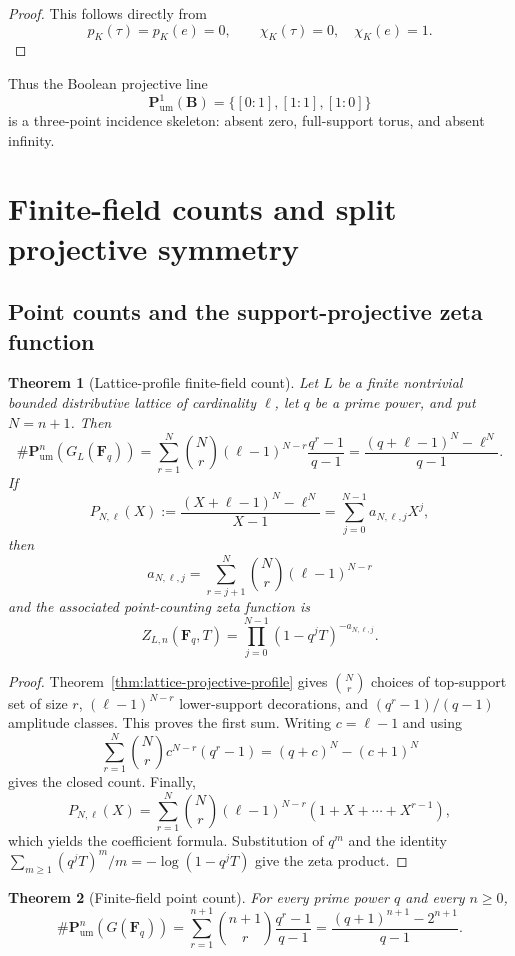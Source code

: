 \documentclass[11pt]{amsart}
\numberwithin{equation}{section}
\newtheorem{theorem}{Theorem}[section]
\theoremstyle{definition}
\newcommand{\B}{\mathbf B}
\newcommand{\F}{\mathbf F}
\newcommand{\Pum}{\mathbf P_{\mathrm{um}}}
\begin{document}
\begin{proof}
This follows directly from
\[
p_K(\tau)=p_K(e)=0,
\qquad
\chi_K(\tau)=0,
\quad
\chi_K(e)=1.
\]
\end{proof}

Thus the Boolean projective line
\[
\Pum^1(\B)=\{[0:1],[1:1],[1:0]\}
\]
is a three-point incidence skeleton: absent zero, full-support torus, and absent infinity.

\section{Finite-field counts and split projective symmetry}

\subsection{Point counts and the support-projective zeta function}


\begin{theorem}[Lattice-profile finite-field count]
\label{thm:lattice-finite-field-count}
Let $L$ be a finite nontrivial bounded distributive lattice of cardinality
$\ell$, let $q$ be a prime power, and put $N=n+1$.  Then
\[
\boxed{
\#\Pum^n(G_L(\F_q))
=\sum_{r=1}^{N}\binom Nr(\ell-1)^{N-r}\frac{q^r-1}{q-1}
=\frac{(q+\ell-1)^N-\ell^N}{q-1}.
}
\]
If
\[
P_{N,\ell}(X)
:=\frac{(X+\ell-1)^N-\ell^N}{X-1}
=\sum_{j=0}^{N-1}a_{N,\ell,j}X^j,
\]
then
\[
a_{N,\ell,j}
=\sum_{r=j+1}^{N}\binom Nr(\ell-1)^{N-r}
\]
and the associated point-counting zeta function is
\[
\boxed{
Z_{L,n}(\F_q,T)
=\prod_{j=0}^{N-1}(1-q^jT)^{-a_{N,\ell,j}}.
}
\]
\end{theorem}

\begin{proof}
Theorem~\ref{thm:lattice-projective-profile} gives
$\binom Nr$ choices of top-support set of size $r$,
$(\ell-1)^{N-r}$ lower-support decorations, and
$(q^r-1)/(q-1)$ amplitude classes.  This proves the first sum.  Writing
$c=\ell-1$ and using
\[
\sum_{r=1}^{N}\binom Nr c^{N-r}(q^r-1)
=(q+c)^N-(c+1)^N
\]
gives the closed count.  Finally,
\[
P_{N,\ell}(X)
=\sum_{r=1}^{N}\binom Nr(\ell-1)^{N-r}
(1+X+\cdots+X^{r-1}),
\]
which yields the coefficient formula.  Substitution of $q^m$ and the
identity
$\sum_{m\ge1}(q^jT)^m/m=-\log(1-q^jT)$ give the zeta product.
\end{proof}

\begin{theorem}[Finite-field point count]\label{thm:finite-field-point-count}
For every prime power $q$ and every $n\ge0$,
\[
\#\Pum^n(G(\F_q))
=
\sum_{r=1}^{n+1}
\binom{n+1}{r}\frac{q^r-1}{q-1}
=
\frac{(q+1)^{n+1}-2^{n+1}}{q-1}.
\]
\end{theorem}
\end{document}
